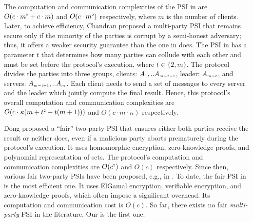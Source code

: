 The computation and communication complexities of the PSI in  \cite{DBLP:conf/ccs/KolesnikovMPRT17} are  $O(c\cdot m^{\scriptscriptstyle 2}+c\cdot m )$ and $O(c\cdot m^{\scriptscriptstyle 2})$ respectively, where $m$ is the number of clients. Later, to achieve efficiency, Chandran \et \cite{ChandranD0OSS21} proposed a multi-party PSI that remains secure only if the minority of the parties is corrupt by a semi-honest adversary; thus, it offers a weaker security guarantee than  the one in \cite{DBLP:conf/ccs/KolesnikovMPRT17} does. The PSI in \cite{NevoTY21} has a parameter $t$ that determines how many parties can collude with each other and must be set before the protocol's execution, where $t\in \{2, m\}$. The protocol divides the parties into three groups, clients: $A_{\scriptscriptstyle 1},..A_{\scriptscriptstyle m-t-1}$, leader: $A_{\scriptscriptstyle m-t}$, and servers: $A_{\scriptscriptstyle m-t+1},..A_{\scriptscriptstyle m}$. Each client needs to send a set of messages to every server and the leader which jointly compute the final result. Hence, this protocol's overall computation and communication complexities are $O(c\cdot \kappa(m+t^{\scriptscriptstyle 2}-t(m+1)))$ and $O(c\cdot m\cdot \kappa)$ respectively.


Dong \et proposed a ``fair'' two-party PSI \cite{DBLP:conf/dbsec/DongCCR13} that ensures either both parties receive the result or neither does, even if a malicious party aborts prematurely during the protocol's execution. It uses homomorphic encryption,  zero-knowledge proofs, and polynomial representation of sets. The protocol's computation and communication complexities are $O(c^{\scriptscriptstyle 2})$ and $O(c)$  respectively. Since then, various fair two-party PSIs have been proposed, e.g.,  in \cite{DebnathD14,DebnathD16-,DebnathD16}. To date, the fair PSI in \cite{DebnathD16} is the most efficient one. It uses ElGamal encryption, verifiable encryption, and zero-knowledge proofs, which often impose a significant overhead. Its computation and communication cost is $O(c)$. So far, there exists no fair \emph{multi-party} PSI in the literature. Our \withFai is the first one.%


